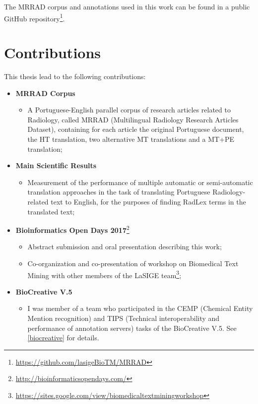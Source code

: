 The MRRAD corpus and annotations used in this work can be found in a public GitHub repository\footnote{\url{https://github.com/lasigeBioTM/MRRAD}}.


\section{Contributions}

This thesis lead to the following contributions: 

\begin{itemize}

\item \textbf{MRRAD Corpus}
	\begin{itemize}
		\item A Portuguese-English parallel corpus of research articles related to Radiology, called MRRAD (Multilingual Radiology Research Articles Dataset), containing for each article the original Portuguese document, the HT translation, two alternative MT translations and a MT+PE translation;
	\end{itemize}
	
\item \textbf{Main Scientific Results}
	\begin{itemize}
		\item Measurement of the performance of multiple automatic or semi-automatic translation approaches in the task of translating Portuguese Radiology-related text to English, for the purposes of finding RadLex terms in the translated text;
	\end{itemize}

\item \textbf{Bioinformatics Open Days 2017}\footnote{\url{http://bioinformaticsopendays.com/}}
	\begin{itemize}
	\item Abstract submission and oral presentation describing this work;
	\item Co-organization and co-presentation of workshop on Biomedical Text Mining with other members of the LaSIGE team\footnote{\url{https://sites.google.com/view/biomedicaltextminingworkshop}};
	\end{itemize}
	
\item \textbf{BioCreative V.5}
	\begin{itemize}
		\item I was member of a team who participated in the CEMP (Chemical Entity Mention recognition) and TIPS (Technical interoperability and performance of annotation servers) tasks of the BioCreative V.5. See \ref{biocreative} for details. 
	\end{itemize}
	

\end{itemize}
